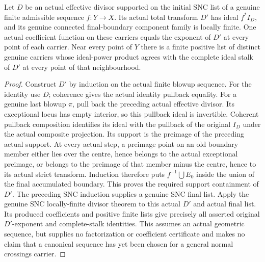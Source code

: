 \begin{theorem}
\label{hir:nc-actual-sequence-transformed-divisor-dictionary}
\leanok
Let $D$ be an actual effective divisor supported on the initial SNC
list of a genuine finite admissible sequence $f:Y\to X$.  Its actual
total transform $D'$ has ideal $f^*I_D$, and its genuine connected
final-boundary component family is locally finite.  One actual
coefficient function on these carriers equals the exponent of $D'$
at every point of each carrier.  Near every point of $Y$ there is a
finite positive list of distinct genuine carriers whose ideal-power
product agrees with the complete ideal stalk of $D'$ at every point
of that neighbourhood.
\end{theorem}
\begin{proof}
Construct $D'$ by induction on the actual finite blowup sequence.
For the identity use $D$; coherence gives the actual identity pullback
equality.  For a genuine last blowup $\pi$, pull back the preceding
actual effective divisor.  Its exceptional locus has empty interior,
so this pullback ideal is invertible.  Coherent pullback composition
identifies its ideal with the pullback of the original $I_D$ under
the actual composite projection.  Its support is the preimage of the
preceding actual support.  At every actual step, a preimage point on an old boundary
member either lies over the centre, hence belongs to the actual
exceptional preimage, or belongs to the preimage of that member
minus the centre, hence to its actual strict transform.  Induction
therefore puts $f^{-1}\bigcup E_0$ inside the union of the final
accumulated boundary.  This proves the required support containment
of $D'$.  The preceding SNC induction supplies a genuine SNC final
list.  Apply the genuine SNC locally-finite divisor theorem to this
actual $D'$ and actual final list.  Its produced coefficients and
positive finite lists give precisely all asserted original
$D'$-exponent and complete-stalk identities.  This assumes an actual
geometric sequence, but supplies no factorization or coefficient
certificate and makes no claim that a canonical sequence has yet
been chosen for a general normal crossings carrier.
\end{proof}
